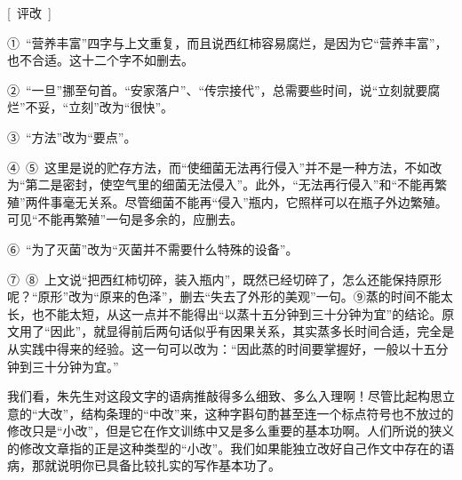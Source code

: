 [\ 评改\ ]

①\ “营养丰富”四字与上文重复，而且说西红柿容易腐烂，是因为它“营养丰富”，也不合适。这十二个字不如删去。

②\ “一旦”挪至句首。“安家落户”、“传宗接代”，总需要些时间，说“立刻就要腐烂”不妥，“立刻”改为“很快”。

③\ “方法”改为“要点”。

④\ ⑤\ 这里是说的贮存方法，而“使细菌无法再行侵入”并不是一种方法，不如改为“第二是密封，使空气里的细菌无法侵入”。此外，“无法再行侵入”和“不能再繁殖”两件事毫无关系。尽管细菌不能再“侵入”瓶内，它照样可以在瓶子外边繁殖。可见“不能再繁殖”一句是多余的，应删去。
\newpage

⑥\ “为了灭菌”改为“灭菌并不需要什么特殊的设备”。

⑦\ ⑧\ 上文说“把西红柿切碎，装入瓶内”，既然已经切碎了，怎么还能保持原形呢？“原形”改为“原来的色泽”，删去“失去了外形的美观”一句。⑨蒸的时间不能太长，也不能太短，从这一点并不能得出“以蒸十五分钟到三十分钟为宜”的结论。原文用了“因此”，就显得前后两句话似乎有因果关系，其实蒸多长时间合适，完全是从实践中得来的经验。这一句可以改为：“因此蒸的时间要掌握好，一般以十五分钟到三十分钟为宜。”

我们看，朱先生对这段文字的语病推敲得多么细致、多么入理啊！尽管比起构思立意的“大改”，结构条理的“中改”来，这种字斟句酌甚至连一个标点符号也不放过的修改只是“小改”，但是它在作文训练中又是多么重要的基本功啊。人们所说的狭义的修改文章指的正是这种类型的“小改”。我们如果能独立改好自己作文中存在的语病，那就说明你已具备比较扎实的写作基本功了。
\newpage